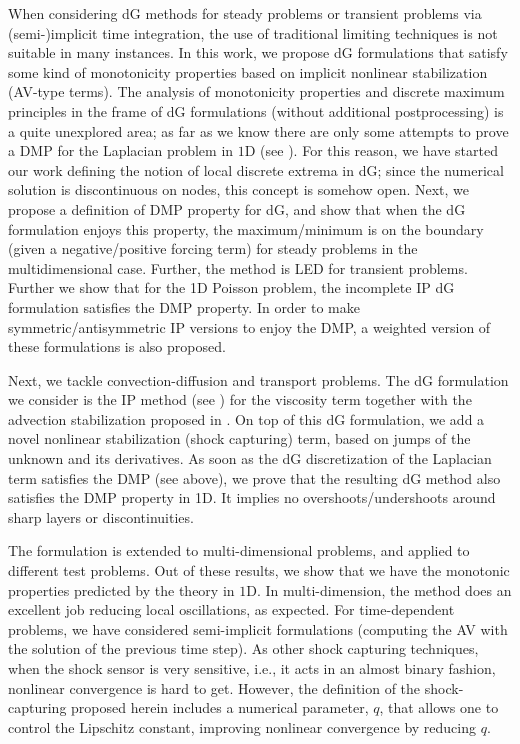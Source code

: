 When considering dG methods for steady problems or transient problems via (semi-)implicit time integration, the use of traditional limiting techniques is not suitable in many instances. In this work, we propose dG formulations that satisfy some kind of monotonicity properties based on implicit nonlinear stabilization (AV-type terms). The analysis of monotonicity properties and discrete maximum principles in the frame of dG formulations (without additional postprocessing) is a quite unexplored area; as far as we know there are only some attempts to prove a DMP for the Laplacian problem in $1$D (see \cite{horvath_discrete_2013}). For this reason, we have started our work defining the notion of local discrete extrema in dG; since the numerical solution is discontinuous on nodes, this concept is somehow open. Next, we propose a definition of DMP property for dG, and show that when the dG formulation enjoys this property, the maximum/minimum is on the boundary (given a  negative/positive forcing term) for steady problems in the multidimensional case. Further, the method is LED for transient problems. Further we show that for the 1D Poisson problem, the incomplete IP dG formulation satisfies the DMP property. In order to make symmetric/antisymmetric IP versions to enjoy the DMP, a weighted version of these formulations is also proposed.

Next, we tackle convection-diffusion and transport problems. The dG formulation we consider is the IP method (see \cite{arnold_unified_2002,horvath_discrete_2013}) for the viscosity term together with the advection stabilization proposed in \cite{brezzi_discontinuous_2004}. On top of this dG formulation, we add a novel nonlinear stabilization (shock capturing) term, based on jumps of the unknown and its derivatives. As soon as the dG discretization of the Laplacian term satisfies the DMP (see above), we prove that the resulting dG method also satisfies the DMP property in 1D. It implies no overshoots/undershoots around sharp layers or discontinuities.

The formulation is extended to multi-dimensional problems, and applied to different test problems. Out of these results, we show that we have the monotonic properties predicted by the theory in $1$D. In multi-dimension, the method does an excellent job reducing local oscillations, as expected. For time-dependent problems, we have considered semi-implicit formulations (computing the AV with the solution of the previous time step). As other shock capturing techniques, when the shock sensor is very sensitive, i.e., it acts in an almost binary fashion, nonlinear convergence is hard to get. However, the definition of the shock-capturing proposed herein includes a numerical parameter, $q$, that allows one to control the Lipschitz constant, improving nonlinear convergence by reducing $q$.     
